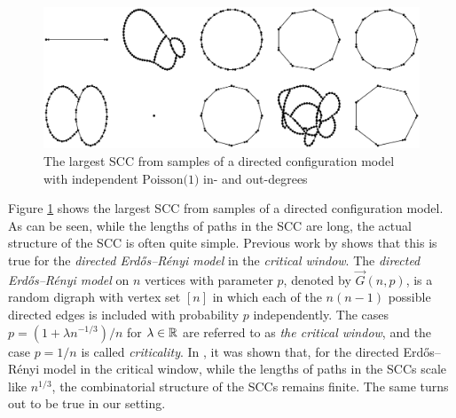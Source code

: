 \begin{figure}[htbp]
    \centering

    \includegraphics[width=\textwidth]{Content/Pictures/Fig3.eps}
    
    \caption{The largest SCC from samples of a directed configuration model with independent $\text{Poisson(1)}$ in- and out-degrees}
    \label{fig:largest-sccs}
\end{figure}

Figure \ref{fig:largest-sccs} shows the largest SCC from samples of a directed configuration model. As can be seen, while the lengths of paths in the SCC are long, the actual structure of the SCC is often quite simple. Previous work by \citet{goldschmidtScalingLimitCritical2019} shows that this is true for the \emph{directed Erdős--Rényi model} in the \emph{critical window}. The \emph{directed Erd\H{o}s--Rényi model} on $n$ vertices with parameter $p$, denoted by $\vec{G}(n,p)$, is a random digraph with vertex set $[n]$ in which each of the $n(n-1)$ possible directed edges is included with probability $p$ independently. The cases $p=(1+\lambda n^{-1/3})/n$ for $\lambda\in{\mathbb R}$ are referred to as \emph{the critical window}, and the case $p=1/n$ is called \emph{criticality}. In \cite{goldschmidtScalingLimitCritical2019}, it was shown that, for the directed Erdős--Rényi model in the critical window, while the lengths of paths in the SCCs scale like $n^{1/3}$, the combinatorial structure of the SCCs remains finite. The same turns out to be true in our setting.

